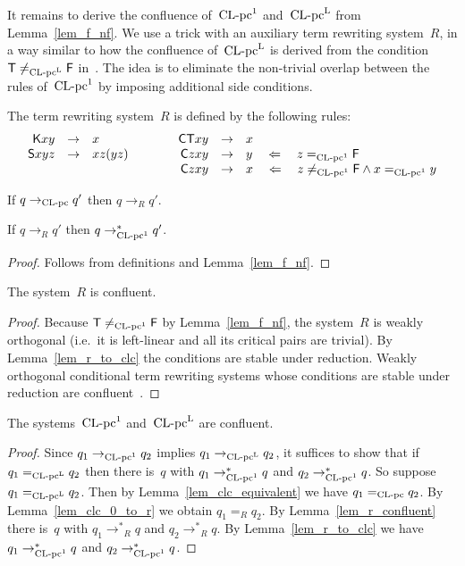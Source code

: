 \documentclass[a4paper,UKenglish]{lipics-v2016}
\newcommand{\Cs}{\mathsf{C}}
\newcommand{\Fs}{\mathsf{F}}
\newcommand{\Ts}{\mathsf{T}}
\newcommand{\Ss}{\mathsf{S}}
\newcommand{\Ks}{\mathsf{K}}
\newcommand{\From}{\ensuremath{\Leftarrow}}
\newcommand{\reduces}{\ensuremath{\to^*}}
\newcommand{\contr}{\ensuremath{\rightarrow}}
\newcommand{\CLC}{{\mbox{${\text{\rm CL-pc}^1}$}}}
\newcommand{\CLCp}{{\mbox{$\text{\rm CL-pc}^{\mathrm{L}}$}}}
\newcommand{\sCLC}{{\ensuremath{\text{\rm CL-pc}^1}}}
\newcommand{\sCLCz}{\ensuremath{\text{\rm CL-pc}}}
\newcommand{\sCLCp}{\ensuremath{\text{\rm CL-pc}^{\mathrm{L}}}}
\begin{document}
It remains to derive the confluence of~$\CLC$ and~$\CLCp$ from
Lemma~\ref{lem_f_nf}. We use a trick with an auxiliary term rewriting
system~$R$, in a way similar to how the confluence of~$\CLCp$ is
derived from the condition~$\Ts \ne_{\sCLCp} \Fs$
in~\cite{Vrijer1999}. The idea is to eliminate the non-trivial overlap
between the rules of~$\CLC$ by imposing additional side conditions.

\begin{definition}
  The term rewriting system~$R$ is defined by the following rules:
  \[
  \begin{array}{rclcrcl}
    \Ks x y &\to& x &\quad\quad& \Cs \Ts x y &\to& x \\
    \Ss x y z &\to& x z (y z) &\quad\quad& \Cs z x y &\to& y \quad\From\quad z =_{\sCLC} \Fs \\
    &&&& \Cs z x y &\to& x \quad\From\quad z \ne_{\sCLC} \Fs \land x =_{\sCLC} y
  \end{array}
  \]
\end{definition}

\begin{lemma}\label{lem_clc_0_to_r}
  If $q \contr_{\sCLCz} q'$ then $q \contr_R q'$.
\end{lemma}

\begin{lemma}\label{lem_r_to_clc}
  If $q \contr_R q'$ then $q \reduces_\sCLC q'$.
\end{lemma}

\begin{proof}
  Follows from definitions and Lemma~\ref{lem_f_nf}.
\end{proof}

\begin{lemma}\label{lem_r_confluent}
  The system~$R$ is confluent.
\end{lemma}

\begin{proof}
  Because $\Ts \ne_\sCLC \Fs$ by Lemma~\ref{lem_f_nf}, the system~$R$
  is weakly orthogonal (i.e.~it is left-linear and all its critical
  pairs are trivial). By Lemma~\ref{lem_r_to_clc} the conditions are
  stable under reduction. Weakly orthogonal conditional term rewriting
  systems whose conditions are stable under reduction are
  confluent~\cite[Chapter 4]{Terese2003}.
\end{proof}

\begin{theorem}
  The systems~$\CLC$ and~$\CLCp$ are confluent.
\end{theorem}

\begin{proof}
  Since $q_1 \contr_{\sCLC} q_2$ implies $q_1 \contr_{\sCLCp} q_2$, it
  suffices to show that if $q_1 =_{\sCLCp} q_2$ then there is~$q$ with
  $q_1 \reduces_\sCLC q$ and $q_2 \reduces_\sCLC q$. So suppose $q_1
  =_{\sCLCp} q_2$. Then by Lemma~\ref{lem_clc_equivalent} we have $q_1
  =_{\sCLCz} q_2$. By Lemma~\ref{lem_clc_0_to_r} we obtain $q_1 =_R
  q_2$. By Lemma~\ref{lem_r_confluent} there is~$q$ with $q_1
  \reduces_R q$ and $q_2 \reduces_R q$. By Lemma~\ref{lem_r_to_clc} we
  have $q_1 \reduces_\sCLC q$ and $q_2 \reduces_\sCLC q$.
\end{proof}

{}
\end{document}
